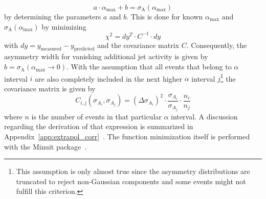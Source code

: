\begin{equation}
 a \cdot \alpha_\mathrm{max} + b = \sigma_\mathrm{A}(\alpha_\mathrm{max})
\end{equation}
by determining the parameters $a$ and $b$. This is done for known $\alpha_\mathrm{max}$ and $\sigma_\mathrm{A}(\alpha_\mathrm{max})$ by minimizing 
\begin{equation}
\chi^2 = dy^T \cdot C^{-1} \cdot dy
\end{equation}
with $dy = y_{\mathrm{measured}} - y_{\mathrm{predicted}}$ and the covariance matrix $C$. Consequently, the asymmetry width for vanishing additional jet activity is given by $b=\sigma_\mathrm{A}(\alpha_\mathrm{max} \rightarrow 0)$. With the assumption that all events that belong to $\alpha$ interval $i$ are also completely included in the next higher $\alpha$ interval $j$\footnote{This assumption is only almost true since the asymmetry distributions are truncated to reject non-Gaussian components and some events might not fulfill this criterion.} the covariance matrix is given by
\begin{equation}
C_{i,j}(\sigma_{A_i},\sigma_{A_j}) = (\Delta \sigma_{A_i})^2 \cdot \frac{\sigma_{A_i}}{\sigma_{A_j}} \cdot \frac{n_i}{n_j} 
\label{eq:jer_corr}
\end{equation}
where $n$ is the number of events in that particular $\alpha$ interval. A discussion regarding the derivation of that expression is summarized in Appendix~\ref{app:extrapol_corr}~\cite{JOtt}. The function minimization itself is performed with the Minuit package~\cite{Minuit}.   
